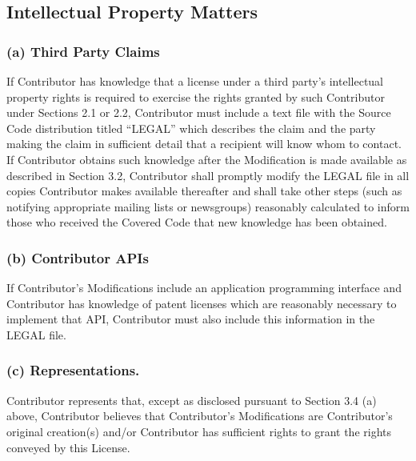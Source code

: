 \documentclass{book}
\begin{document}
\subsection{Intellectual Property Matters}
\subsubsection{(a) Third Party Claims}
If Contributor has knowledge that a license under a third party's intellectual property rights is required to exercise the rights granted by such Contributor under Sections 2.1 or 2.2, Contributor must include a text file with the Source Code distribution titled ``LEGAL'' which describes the claim and the party making the claim in sufficient detail that a recipient will know whom to contact. If Contributor obtains such knowledge after the Modification is made available as described in Section 3.2, Contributor shall promptly modify the LEGAL file in all copies Contributor makes available thereafter and shall take other steps (such as notifying appropriate mailing lists or newsgroups) reasonably calculated to inform those who received the Covered Code that new knowledge has been obtained. 

\subsubsection{(b) Contributor APIs}
If Contributor's Modifications include an application programming interface and Contributor has knowledge of patent licenses which are reasonably necessary to implement that API, Contributor must also include this information in the LEGAL file. 

\subsubsection{(c) Representations.}
Contributor represents that, except as disclosed pursuant to Section 3.4 (a) above, Contributor believes that Contributor's Modifications are Contributor's original creation(s) and/or Contributor has sufficient rights to grant the rights conveyed by this License. 
\end{document}
